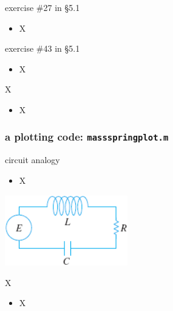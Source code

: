 \documentclass{beamer}
\begin{document}
\begin{frame}{exercise \#27 in \S5.1}

\begin{itemize}
\item X
\end{itemize}
\end{frame}


\begin{frame}{exercise \#43 in \S5.1}

\begin{itemize}
\item X
\end{itemize}
\end{frame}


\begin{frame}{X}

\begin{itemize}
\item X
\end{itemize}
\end{frame}


\begin{frame}[fragile]
\frametitle{a plotting code: \texttt{massspringplot.m}}

\end{frame}


\begin{frame}{circuit analogy}

\begin{itemize}
\item X
\end{itemize}

\includegraphics[width=0.4\textwidth]{figs/rlc-circuit}
\end{frame}


\begin{frame}{X}

\begin{itemize}
\item X
\end{itemize}
\end{frame}
\end{document}
